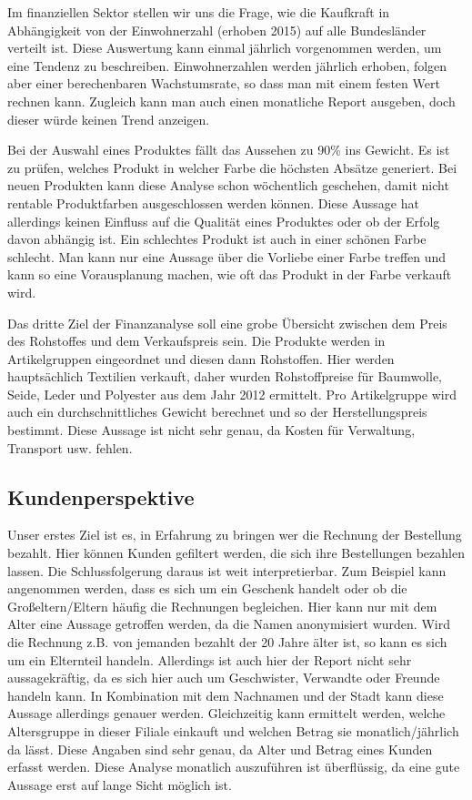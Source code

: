 Im finanziellen Sektor stellen wir uns die Frage, wie die Kaufkraft in Abhängigkeit von der Einwohnerzahl (erhoben 2015) auf alle Bundesländer verteilt ist. Diese Auswertung kann einmal jährlich vorgenommen werden, um eine Tendenz zu beschreiben. Einwohnerzahlen werden jährlich erhoben, folgen aber einer berechenbaren Wachstumsrate, so dass man mit einem festen Wert rechnen kann. Zugleich kann man auch einen monatliche Report ausgeben, doch dieser würde keinen Trend anzeigen.
 
Bei der Auswahl eines Produktes fällt das Aussehen zu 90\% ins Gewicht. Es ist zu prüfen, welches Produkt in welcher Farbe die höchsten Absätze generiert. Bei neuen Produkten kann diese Analyse schon wöchentlich geschehen, damit nicht rentable Produktfarben ausgeschlossen werden können. Diese Aussage hat allerdings keinen Einfluss auf die Qualität eines Produktes oder ob der Erfolg davon abhängig ist. Ein schlechtes Produkt ist auch in einer schönen Farbe schlecht. Man kann nur eine Aussage über die Vorliebe einer Farbe treffen und kann so eine Vorausplanung machen, wie oft das Produkt in der Farbe verkauft wird.
 
Das dritte Ziel der Finanzanalyse soll eine grobe Übersicht zwischen dem Preis des Rohstoffes und dem Verkaufspreis sein. Die Produkte werden in Artikelgruppen eingeordnet und diesen dann Rohstoffen. Hier werden hauptsächlich Textilien verkauft, daher wurden Rohstoffpreise für Baumwolle, Seide, Leder und Polyester aus dem Jahr 2012 ermittelt. Pro Artikelgruppe wird auch ein durchschnittliches Gewicht berechnet und so der Herstellungspreis bestimmt. Diese Aussage ist nicht sehr genau, da Kosten für Verwaltung, Transport usw. fehlen. 
 
\subsection*{Kundenperspektive}
 
Unser erstes Ziel ist es, in Erfahrung zu bringen wer die Rechnung der Bestellung bezahlt. Hier können Kunden gefiltert werden, die sich ihre Bestellungen bezahlen lassen. Die Schlussfolgerung daraus ist weit interpretierbar. Zum Beispiel kann angenommen werden, dass es sich um ein Geschenk handelt oder ob die Großeltern/Eltern häufig die Rechnungen begleichen. Hier kann nur mit dem Alter eine Aussage getroffen werden, da die Namen anonymisiert wurden. Wird die Rechnung z.B. von jemanden bezahlt der 20 Jahre älter ist, so kann es sich um ein Elternteil handeln. Allerdings ist auch hier der Report nicht sehr aussagekräftig, da es sich hier auch um Geschwister, Verwandte oder Freunde handeln kann. In Kombination mit dem Nachnamen und der Stadt kann diese Aussage allerdings genauer werden. 
Gleichzeitig kann ermittelt werden, welche Altersgruppe in dieser Filiale einkauft und welchen Betrag sie monatlich/jährlich da lässt. Diese Angaben sind sehr genau, da Alter und Betrag eines Kunden erfasst werden. Diese Analyse monatlich auszuführen ist überflüssig, da eine gute Aussage erst auf lange Sicht möglich ist. 
 

